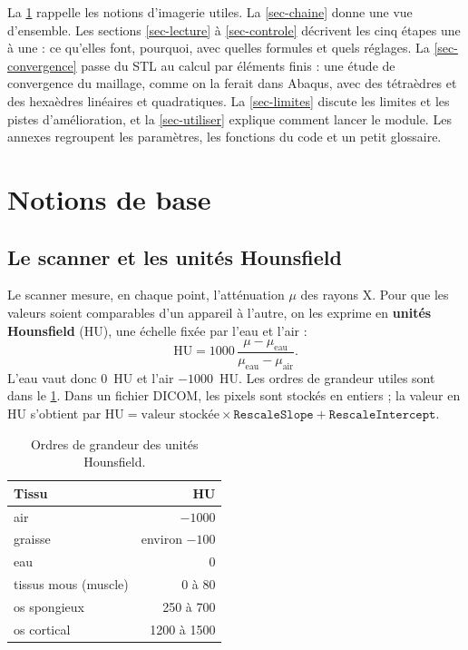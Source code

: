 \documentclass[11pt,a4paper]{article}
\begin{document}
La \cref{sec-notions} rappelle les notions d'imagerie utiles. La \cref{sec-chaine} donne une vue d'ensemble. Les
sections \ref{sec-lecture} à \ref{sec-controle} décrivent les cinq étapes une à une : ce qu'elles font, pourquoi, avec
quelles formules et quels réglages. La \cref{sec-convergence} passe du STL au calcul par éléments finis : une étude
de convergence du maillage, comme on la ferait dans Abaqus, avec des tétraèdres et des hexaèdres linéaires et
quadratiques. La \cref{sec-limites} discute les limites et les pistes d'amélioration, et la
\cref{sec-utiliser} explique comment lancer le module. Les annexes regroupent les paramètres, les fonctions du code et
un petit glossaire.

\section{Notions de base}
\label{sec-notions}

\subsection{Le scanner et les unités Hounsfield}

Le scanner mesure, en chaque point, l'atténuation $\mu$ des rayons X. Pour que les valeurs soient comparables d'un
appareil à l'autre, on les exprime en \textbf{unités Hounsfield} (HU), une échelle fixée par l'eau et l'air :
\begin{equation}
  \mathrm{HU} = 1000\,\frac{\mu - \mu_{\text{eau}}}{\mu_{\text{eau}} - \mu_{\text{air}}}.
\end{equation}
L'eau vaut donc 0~HU et l'air $-1000$~HU. Les ordres de grandeur utiles sont dans le \cref{tab-hu}. Dans un fichier
DICOM, les pixels sont stockés en entiers ; la valeur en HU s'obtient par
$\mathrm{HU} = \text{valeur stockée} \times \texttt{RescaleSlope} + \texttt{RescaleIntercept}$.

\begin{table}[h]
\centering\small
\caption{Ordres de grandeur des unités Hounsfield.}
\label{tab-hu}
\begin{tabular}{lr}
\toprule
\textbf{Tissu} & \textbf{HU} \\
\midrule
air & $-1000$ \\
graisse & environ $-100$ \\
eau & 0 \\
tissus mous (muscle) & 0 à 80 \\
os spongieux & 250 à 700 \\
os cortical & 1200 à 1500 \\
\bottomrule
\end{tabular}
\end{table}
\end{document}
